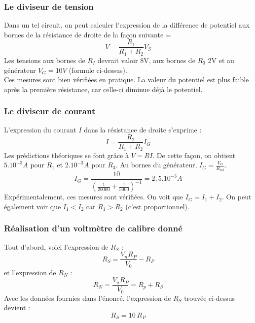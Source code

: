 \documentclass	[11pt, a4paper, openany]{book}
\begin{document}
\subsubsection*{Le diviseur de tension}
Dans un tel circuit, on peut calculer l'expression de la différence de potentiel aux bornes de la résistance de droite de la façon suivante = 
\begin{equation}
V = \frac{R_1}{R_1 + R_2}V_S
\end{equation}
Les tensions aux bornes de $R_I$ devrait valoir 8V, aux bornes de $R_3$ 2V et au générateur $V_G = 10V$ (formule ci-dessus).\\
Ces mesures sont bien vérifiées en pratique. La valeur du potentiel est plus faible après la première résistance, car celle-ci diminue déjà le potentiel.

\subsubsection*{Le diviseur de courant}
L'expression du courant $I$ dans la résistance de droite s'exprime : 
\begin{equation}
I = \frac{R_2}{R_1 + R_2}I_G
\end{equation}
Les prédictions théoriques se font grâce à $V = RI$. De cette façon, on obtient $5.10^{-3} A$ pour $R_1$ et $2.10^{-3} A$ pour $R_3$. Au bornes du générateur, $I_G = \frac{V_G}{R_{tot}}
$.
\begin{equation}
I_G = \frac{10}{\left(\frac{1}{20000} + \frac{1}{5000} \right)^{-1}} = 2,5.10^{-3} A
\end{equation}
Expérimentalement, ces mesures sont vérifiées. On voit que $I_G = I_1 + I_2$. 
On peut également voir que $I_1 < I_2$ car $R_1 > R_2$ (c'est proportionnel).

\subsubsection*{Réalisation d'un voltmètre de calibre donné}
Tout d'abord, voici l'expression de $R_S$ :
\begin{equation}
R_S = \frac{V_n R_P}{V_0} - R_P
\end{equation}
et l'expression de $R_N$ :
\begin{equation}
R_N = \frac{V_n R_P}{V_0} = R_p + R_S
\end{equation}
Avec les données fournies dans l'énoncé, l'expression de $R_S$ trouvée ci-dessus devient : 
\begin{equation}
R_S = 10\ R_P
\end{equation}
\end{document}
